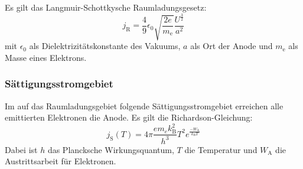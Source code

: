 Es gilt das Langmuir-Schottkysche Raumladungsgesetz:
\begin{equation}
  \label{eqn:langmuir}
  j_\mathrm{R}=\frac{4}{9} \epsilon_0 \sqrt{\frac{2e}{m_\mathrm{e}}}\frac{U^{\frac{3}{2}}}{a^2}
\end{equation}
mit $\epsilon_0$ als Dielektrizitätskonstante des Vakuums, $a$ als Ort der Anode und $m_\mathrm{e}$ als Masse eines Elektrons.

\subsubsection{Sättigungsstromgebiet}
Im auf das Raumladungsgebiet folgende Sättigungsstromgebiet erreichen alle emittierten Elektronen die Anode. Es gilt die Richardson-Gleichung:
\begin{equation}
  \label{eqn:richardson}
  j_\mathrm{S}(T)=4\pi\frac{e m_e k_\mathrm{B}^2}{h^3}T^2e^{\frac{-W_\mathrm{A}}{k_\mathrm{B}T}}
\end{equation}
Dabei ist $h$ das Plancksche Wirkungsquantum, $T$ die Temperatur und $W_\mathrm{A}$ die Austrittsarbeit für Elektronen.
